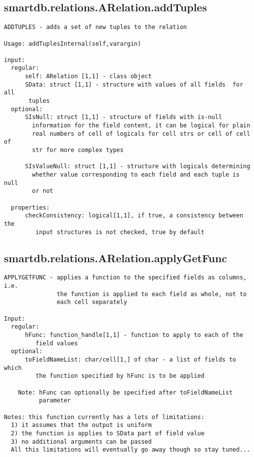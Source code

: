 \subsection{\texorpdfstring{smartdb.relations.ARelation.addTuples}{addTuples}}\label{method:smartdb.relations.ARelation.addTuples}
\begin{verbatim}
ADDTUPLES - adds a set of new tuples to the relation

Usage: addTuplesInternal(self,varargin)

input:
  regular:
      self: ARelation [1,1] - class object
      SData: struct [1,1] - structure with values of all fields  for all
       tuples
  optional:
      SIsNull: struct [1,1] - structure of fields with is-null
        information for the field content, it can be logical for plain
        real numbers of cell of logicals for cell strs or cell of cell of
        str for more complex types

      SIsValueNull: struct [1,1] - structure with logicals determining
        whether value corresponding to each field and each tuple is null
        or not

  properties:
      checkConsistency: logical[1,1], if true, a consistency between the
         input structures is not checked, true by default
\end{verbatim}
\subsection{\texorpdfstring{smartdb.relations.ARelation.applyGetFunc}{applyGetFunc}}\label{method:smartdb.relations.ARelation.applyGetFunc}
\begin{verbatim}
APPLYGETFUNC - applies a function to the specified fields as columns, i.e.
               the function is applied to each field as whole, not to
               each cell separately

Input:
  regular:
      hFunc: function_handle[1,1] - function to apply to each of the
         field values
  optional:
      toFieldNameList: char/cell[1,] of char - a list of fields to which
         the function specified by hFunc is to be applied

    Note: hFunc can optionally be specified after toFieldNameList
          parameter

Notes: this function currently has a lots of limitations:
  1) it assumes that the output is uniform
  2) the function is applies to SData part of field value
  3) no additional arguments can be passed
  All this limitations will eventually go away though so stay tuned...
\end{verbatim}
